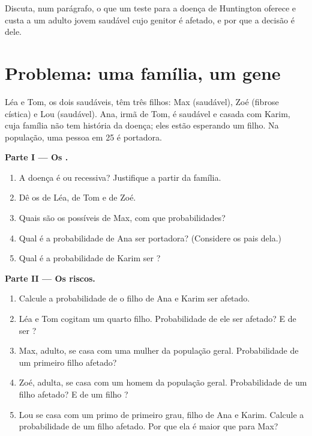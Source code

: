 \begin{exercise}[$\star\star\star$]\label{exo:g11:genes-and-disease:15}
Discuta, num parágrafo, o que um teste para a doença de Huntington
oferece e custa a um adulto jovem saudável cujo genitor é afetado, e
por que a decisão é dele.
\end{exercise}

\section{Problema: uma família, um gene}

\begin{problem}
\label{pb:g11:genes-and-disease:1}
Léa e Tom, os dois saudáveis, têm três filhos: Max (saudável), Zoé
(fibrose cística) e Lou (saudável). Ana, irmã de Tom, é saudável e
casada com Karim, cuja família não tem história da doença; eles estão
esperando um filho. Na população, uma pessoa em 25 é portadora.

\medskip
\noindent\textbf{Parte I --- Os .}
\begin{enumerate}
  \item A doença é  ou recessiva? Justifique a partir da
        família.
  \item Dê os  de Léa, de Tom e de Zoé.
  \item Quais são os  possíveis de Max, com que
        probabilidades?
  \item Qual é a probabilidade de Ana ser portadora? (Considere os pais
        dela.)
  \item Qual é a probabilidade de Karim ser ?
\end{enumerate}

\medskip
\noindent\textbf{Parte II --- Os riscos.}
\begin{enumerate}[resume]
  \item Calcule a probabilidade de o filho de Ana e Karim ser afetado.
  \item Léa e Tom cogitam um quarto filho. Probabilidade de ele ser
        afetado? E de ser ?
  \item Max, adulto, se casa com uma mulher da população geral.
        Probabilidade de um primeiro filho afetado?
  \item Zoé, adulta, se casa com um homem da população geral.
        Probabilidade de um filho afetado? E de um filho ?
  \item Lou se casa com um primo de primeiro grau, filho de Ana e
        Karim. Calcule a probabilidade de um filho afetado. Por que ela
        é maior que para Max?
\end{enumerate}


\end{problem}
